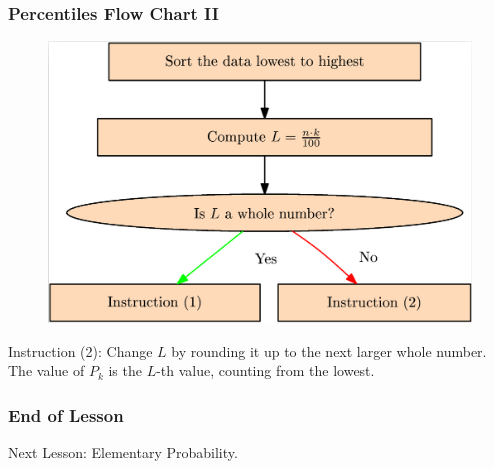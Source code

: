 \documentclass[xcolor=dvipsnames]{beamer}
\begin{document}
\begin{frame}
  \frametitle{Percentiles Flow Chart II}
\begin{figure}[h]
\includegraphics[scale=.15]{./diagrams/percentile.png}
\end{figure}
Instruction (2): Change $L$ by rounding it up to the next larger
whole number. The value of $P_{k}$ is the $L$-th value, counting
from the lowest.
\end{frame}

\begin{frame}
  \frametitle{End of Lesson}
Next Lesson: Elementary Probability.
\end{frame}
\end{document}
